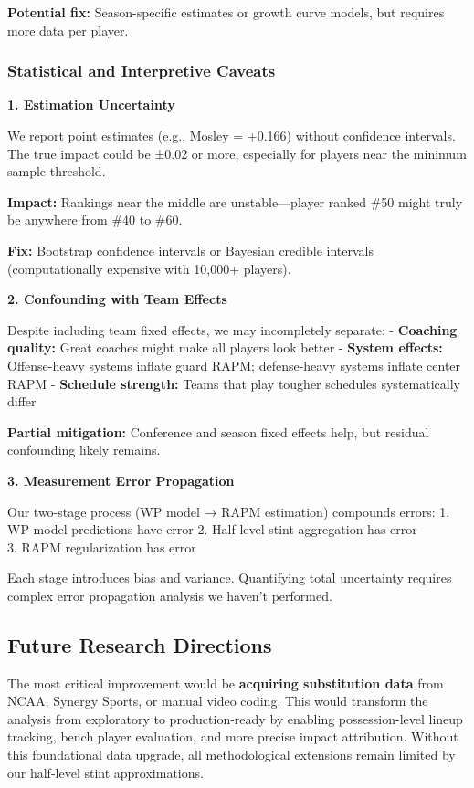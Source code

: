 \documentclass[
  letterpaper,
  DIV=11,
  numbers=noendperiod]{scrartcl}
\begin{document}
\textbf{Potential fix:} Season-specific estimates or growth curve
models, but requires more data per player.

\subsubsection{Statistical and Interpretive
Caveats}\label{statistical-and-interpretive-caveats}

\textbf{1. Estimation Uncertainty}

We report point estimates (e.g., Mosley = +0.166) without confidence
intervals. The true impact could be ±0.02 or more, especially for
players near the minimum sample threshold.

\textbf{Impact:} Rankings near the middle are unstable---player ranked
\#50 might truly be anywhere from \#40 to \#60.

\textbf{Fix:} Bootstrap confidence intervals or Bayesian credible
intervals (computationally expensive with 10,000+ players).

\textbf{2. Confounding with Team Effects}

Despite including team fixed effects, we may incompletely separate: -
\textbf{Coaching quality:} Great coaches might make all players look
better - \textbf{System effects:} Offense-heavy systems inflate guard
RAPM; defense-heavy systems inflate center RAPM - \textbf{Schedule
strength:} Teams that play tougher schedules systematically differ

\textbf{Partial mitigation:} Conference and season fixed effects help,
but residual confounding likely remains.

\textbf{3. Measurement Error Propagation}

Our two-stage process (WP model → RAPM estimation) compounds errors: 1.
WP model predictions have error 2. Half-level stint aggregation has
error\\
3. RAPM regularization has error

Each stage introduces bias and variance. Quantifying total uncertainty
requires complex error propagation analysis we haven't performed.

\subsection{Future Research
Directions}\label{future-research-directions}

The most critical improvement would be \textbf{acquiring substitution
data} from NCAA, Synergy Sports, or manual video coding. This would
transform the analysis from exploratory to production-ready by enabling
possession-level lineup tracking, bench player evaluation, and more
precise impact attribution. Without this foundational data upgrade, all
methodological extensions remain limited by our half-level stint
approximations.
\end{document}
